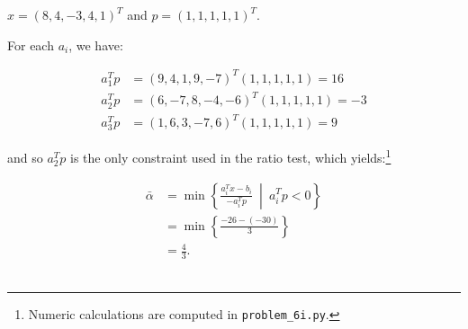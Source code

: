 $x = (8, 4, -3, 4, 1)^T$ and $p = (1, 1, 1, 1, 1)^T.$

\begin{solution}
  For each $a_i$, we have:

  \begin{align*}
    a_1^T p &= (9, 4, 1, 9, -7)^T (1, 1, 1, 1, 1) = 16 \\
    a_2^T p &= (6, -7, 8, -4, -6)^T (1, 1, 1, 1, 1) = -3 \\
    a_3^T p &= (1, 6, 3, -7, 6)^T (1, 1, 1, 1, 1) = 9
  \end{align*}

  and so $a_2^T p$ is the only constraint used in the ratio test, which yields:\footnote{
    Numeric calculations are computed in \texttt{problem\_6i.py}.
  }

  \begin{align*}
    \bar{\alpha} &= \min \left\{ \frac{a_i^T x - b_i}{-a_i^Tp} \ \middle| \ a_i^T p < 0 \right\} \\
                 &= \min \left\{ \frac{-26 - (-30)}{3} \right\} \\
                 &= \frac{4}{3}.
  \end{align*}
  \ \\
\end{solution}